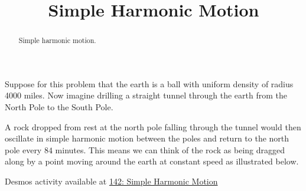 \documentclass{ximera}
\title{Simple Harmonic Motion}
\begin{document}
\begin{abstract}
Simple harmonic motion.
\end{abstract}
\maketitle

Suppose for this problem that the earth is a ball with uniform density of radius 4000 miles. Now imagine drilling a straight tunnel through the earth from the North Pole to the South Pole. 

A rock dropped from rest at the north pole falling through the tunnel would then oscillate in simple harmonic motion between the poles and return to the north pole every $84$ minutes. This means we can think of the rock as being dragged along by a point moving around the earth at constant speed as illustrated below. 

\begin{onlineOnly}
    \begin{center}
\end{center}
\end{onlineOnly}

Desmos activity available at \href{https://www.desmos.com/calculator/lujzuu3rn0}{142: Simple Harmonic Motion}
\end{document}
